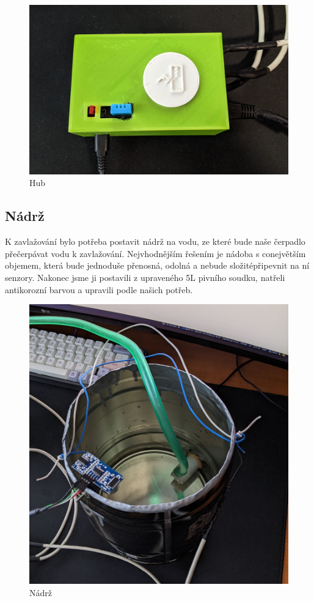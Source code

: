 \documentclass[czech,12pt,a4paper]{article}
\begin{document}
\vspace*{1cm}
\begin{figure}[h]
	\centering
	\includegraphics[width=0.82\linewidth]{hub.jpeg}
	\caption{Hub}
\end{figure}

\clearpage

\subsection{Nádrž}

K zavlažování bylo potřeba postavit nádrž na vodu, ze které bude naše čerpadlo přečerpávat vodu k zavlažování. Nejvhodnějším řešením je nádoba s co\linebreak největším objemem, která bude jednoduše přenosná, odolná a nebude složité\linebreak připevnit na ní senzory. Nakonec jsme ji postavili z upraveného 5L pivního soudku, natřeli antikorozní barvou a upravili podle našich potřeb.

\vspace*{1cm}
\begin{figure}[h]
	\centering
	\includegraphics[width=0.7\linewidth]{nadrz.jpeg}
	\caption{Nádrž}
\end{figure}
\end{document}
